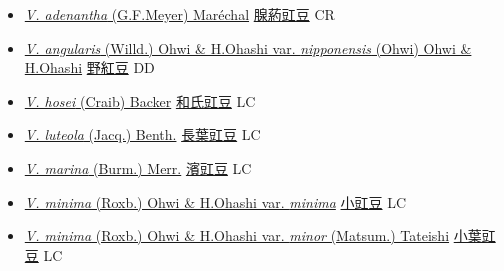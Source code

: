 \begin{itemize}
  \begin{itemize}
        \item[] \href{http://www.theplantlist.org/tpl1.1/search?q=Vigna+adenantha}{\textit{V. adenantha} (G.F.Meyer) Maréchal}   \href{\detokenize{http://taibnet.sinica.edu.tw/chi/taibnet_species_list.php?T2=腺葯豇豆&T2_new_value=true&fr=y}}{腺葯豇豆} CR
        \item[] \href{http://www.theplantlist.org/tpl1.1/search?q=Vigna+angularis+var.+nipponensis}{\textit{V. angularis} (Willd.) Ohwi \& H.Ohashi var. \textit{nipponensis} (Ohwi) Ohwi \& H.Ohashi}   \href{\detokenize{http://taibnet.sinica.edu.tw/chi/taibnet_species_list.php?T2=野紅豆&T2_new_value=true&fr=y}}{野紅豆} DD
        \item[] \href{http://www.theplantlist.org/tpl1.1/search?q=Vigna+hosei}{\textit{V. hosei} (Craib) Backer}   \href{\detokenize{http://taibnet.sinica.edu.tw/chi/taibnet_species_list.php?T2=和氏豇豆&T2_new_value=true&fr=y}}{和氏豇豆} LC
        \item[] \href{http://www.theplantlist.org/tpl1.1/search?q=Vigna+luteola}{\textit{V. luteola} (Jacq.) Benth.}   \href{\detokenize{http://taibnet.sinica.edu.tw/chi/taibnet_species_list.php?T2=長葉豇豆&T2_new_value=true&fr=y}}{長葉豇豆} LC
        \item[] \href{http://www.theplantlist.org/tpl1.1/search?q=Vigna+marina}{\textit{V. marina} (Burm.) Merr.}   \href{\detokenize{http://taibnet.sinica.edu.tw/chi/taibnet_species_list.php?T2=濱豇豆&T2_new_value=true&fr=y}}{濱豇豆} LC
        \item[] \href{http://www.theplantlist.org/tpl1.1/search?q=Vigna+minima+var.+minima}{\textit{V. minima} (Roxb.) Ohwi \& H.Ohashi var. \textit{minima}}   \href{\detokenize{http://taibnet.sinica.edu.tw/chi/taibnet_species_list.php?T2=小豇豆&T2_new_value=true&fr=y}}{小豇豆} LC
        \item[] \href{http://www.theplantlist.org/tpl1.1/search?q=Vigna+minima+var.+minor}{\textit{V. minima} (Roxb.) Ohwi \& H.Ohashi var. \textit{minor} (Matsum.) Tateishi}   \href{\detokenize{http://taibnet.sinica.edu.tw/chi/taibnet_species_list.php?T2=小葉豇豆&T2_new_value=true&fr=y}}{小葉豇豆} LC

\end{itemize}
\end{itemize}
